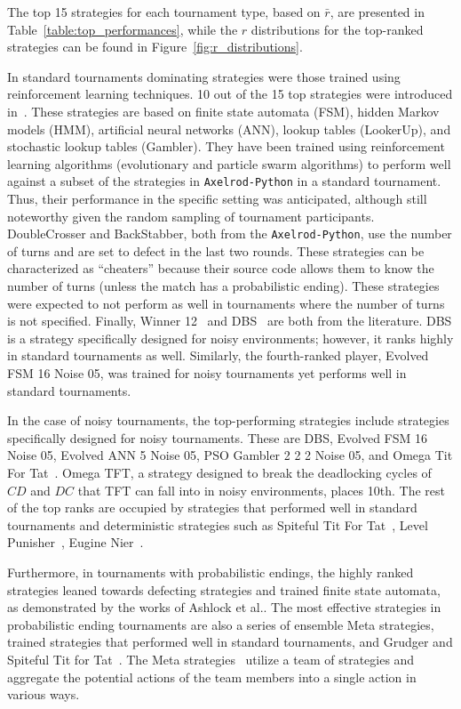 \documentclass{article}
\def\axelrod{\texttt{Axelrod-Python}}
\begin{document}
The top 15 strategies for each tournament type, based on \(\bar{r}\), are
presented in Table~\ref{table:top_performances}, while the \(r\) distributions
for the top-ranked strategies can be found in Figure~\ref{fig:r_distributions}.

In standard tournaments dominating strategies were those
trained using reinforcement learning techniques. 10 out of the 15 top strategies
were introduced in~\cite{Harper2017}. These strategies are based on finite state
automata (FSM), hidden Markov models (HMM), artificial neural networks (ANN),
lookup tables (LookerUp), and stochastic lookup tables (Gambler). They have been
trained using reinforcement learning algorithms (evolutionary and particle swarm
algorithms) to perform well against a subset of the strategies in \axelrod{} in a
standard tournament. Thus, their performance in the specific setting was
anticipated, although still noteworthy given the random sampling of tournament
participants. DoubleCrosser and BackStabber, both from the \axelrod, use the
number of turns and are set to defect in the last two rounds. These strategies
can be characterized as “cheaters” because their source code allows them to know
the number of turns (unless the match has a probabilistic ending). These
strategies were expected to not perform as well in tournaments where the number
of turns is not specified. Finally, Winner 12~\cite{mathieu2017} and
DBS~\cite{Au2006} are both from the literature. DBS is a strategy specifically
designed for noisy environments; however, it ranks highly in standard
tournaments as well. Similarly, the fourth-ranked player, Evolved FSM 16 Noise
05, was trained for noisy tournaments yet performs well in standard tournaments.

In the case of noisy tournaments, the
top-performing strategies include strategies specifically designed for noisy
tournaments. These are DBS, Evolved FSM 16 Noise 05, Evolved ANN 5 Noise 05, PSO
Gambler 2 2 2 Noise 05, and Omega Tit For Tat~\cite{kendall2007iterated}. Omega
TFT, a strategy designed to break the deadlocking cycles of \(CD\) and \(DC\)
that TFT can fall into in noisy environments, places 10th. The rest of the top
ranks are occupied by strategies that performed well in standard tournaments and
deterministic strategies such as Spiteful Tit For Tat~\cite{prison}, Level
Punisher~\cite{Eckhart2015}, Eugine Nier~\cite{lesswrong}.

Furthermore, in tournaments with probabilistic endings, the highly ranked
strategies leaned towards defecting strategies and trained finite state
automata, as demonstrated by the works of Ashlock et
al.\cite{Ashlock2006,Ashlock2014}. The most effective strategies in
probabilistic ending tournaments are also a series of ensemble Meta strategies,
trained strategies that performed well in standard tournaments, and
Grudger\cite{axelrodproject} and Spiteful Tit for Tat~\cite{prison}. The Meta
strategies~\cite{axelrodproject} utilize a team of strategies and aggregate the
potential actions of the team members into a single action in various ways.
\end{document}

